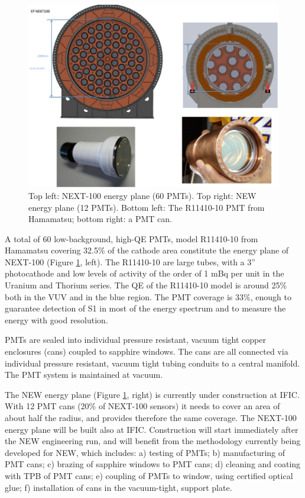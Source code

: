 \begin{figure}[t!b!]
\begin{center}
\includegraphics[width=.9\textwidth]{img/EPNext-100.png}
\end{center}
\caption{Top left: NEXT-100 energy plane (60 PMTs). Top right: NEW energy plane (12 PMTs).
Bottom left: The R11410-10 PMT from Hamamatsu; bottom right: a PMT can.} \label{fig:EnergyPlane}
\end{figure}


A total of 60 low-background, high-QE PMTs, model R11410-10 from Hamamatsu covering 32.5\% of the cathode area constitute the energy plane of NEXT-100 (Figure \ref{fig:EnergyPlane}, left). The R11410-10 are large tubes, with a 3'' photocathode and low levels of  activity of the order of 1 mBq per unit in the Uranium and Thorium series. The QE of the R11410-10 model is around 25\% both in the VUV and in the blue region. The  PMT coverage is 33\%, enough to guarantee detection of S1 in most of the energy spectrum and to measure the energy with good resolution.

PMTs are sealed into individual pressure resistant, vacuum tight copper enclosures (cans) coupled to 
sapphire windows. The cans are all connected via individual pressure resistant, vacuum tight tubing conduits to a central manifold. The PMT system is maintained at vacuum.

The NEW energy plane (Figure \ref{fig:EnergyPlane}, right) is currently under construction at IFIC. With 12 PMT cans (20\% of NEXT-100 sensors) it needs to cover an area of about half the radius, and provides therefore the same coverage. The NEXT-100 energy plane will be built also at IFIC. Construction will start immediately after the NEW engineering run, and will benefit from the methodology currently being developed for NEW, which includes: a) testing of PMTs; b) manufacturing of PMT cans; c) brazing of sapphire windows to PMT cans; d) cleaning and coating with TPB of PMT cans; e) coupling of PMTs to window, using certified optical glue; f) installation of cans in the vacuum-tight, support plate. 

